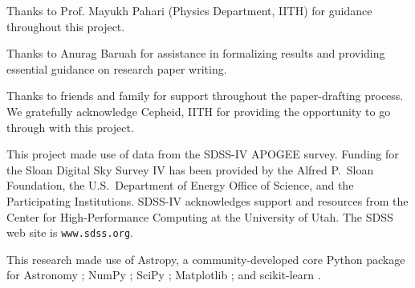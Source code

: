 \documentclass[preprint]{aastex701-1/aastex701}
\begin{document}
\begin{acknowledgments}

Thanks to Prof. Mayukh Pahari (Physics Department, IITH) for guidance throughout this
project.

Thanks to Anurag Baruah for assistance in formalizing results and providing essential
guidance on research paper writing.

Thanks to friends and family for support throughout the paper-drafting process. We
gratefully acknowledge Cepheid, IITH for providing the opportunity to go through with
this project.

This project made use of data from the SDSS-IV APOGEE survey. Funding for
the Sloan Digital Sky Survey IV has been provided by the Alfred P.\ Sloan Foundation,
the U.S.\ Department of Energy Office of Science, and the Participating Institutions.
SDSS-IV acknowledges support and resources from the Center for High-Performance Computing
at the University of Utah. The SDSS web site is \texttt{www.sdss.org}.

This research made use of Astropy, a community-developed core Python package for
Astronomy \citep{Astropy2013}; NumPy \citep{vanderWalt2011}; SciPy \citep{Jones2001};
Matplotlib \citep{Hunter2007}; and scikit-learn \citep{Pedregosa2011}.
\end{acknowledgments}
\end{document}
